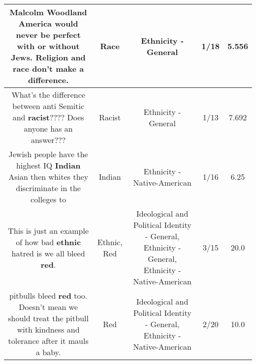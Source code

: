 \documentclass[11pt]{article}
\newlength\mylength
\begin{document}
\begin{center}
\begin{longtable}{|C{.65\mylength}|C{.30\mylength}|C{.12\mylength}|C{.12\mylength}|C{.12\mylength}|}
  \small Malcolm Woodland America would never be perfect with or without Jews. Religion and \textbf{race} don't make a difference.\normalsize   & Race & Ethnicity - General & 1/18 & 5.556 \\  \hline
  \small What's the difference between anti Semitic and \textbf{racist}???? Does anyone has an answer???\normalsize   & Racist & Ethnicity - General & 1/13 & 7.692 \\  \hline
  \small Jewish people have the highest IQ \textbf{Indian} Asian then whites they discriminate in the colleges to\normalsize   & Indian & Ethnicity - Native-American & 1/16 & 6.25 \\  \hline
  \small This is just an example of how bad \textbf{ethnic} hatred is we all bleed \textbf{r\textbf{ed}}.\normalsize   & Ethnic, Red &  Ideological and Political Identity - General, Ethnicity - General, Ethnicity - Native-American & 3/15 & 20.0 \\  \hline
  \small pitbulls bleed \textbf{r\textbf{ed}} too. Doesn't mean we should treat the pitbull with kindness and tolerance after it mauls a baby.\normalsize   & Red &  Ideological and Political Identity - General, Ethnicity - Native-American & 2/20 & 10.0 \\  \hline

\end{longtable}
\end{center}
\end{document}
